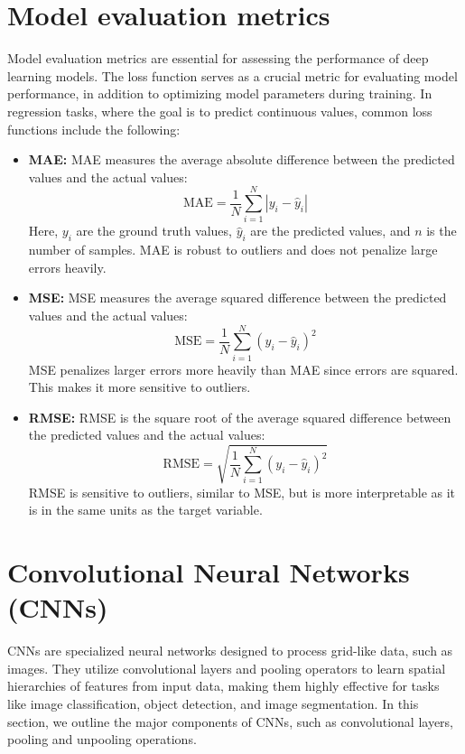 \section{Model evaluation metrics}
Model evaluation metrics are essential for assessing the performance of deep learning models. The loss function serves as a crucial metric for evaluating model performance, in addition to optimizing model parameters during training. In regression tasks, where the goal is to predict continuous values, common loss functions include the following:
\begin{itemize}
\item \textbf{\gls{MAE}:} MAE measures the average absolute difference between the predicted values and the actual values:\[ \text{MAE} = \frac{1}{N} \sum_{i=1}^{N} |y_i - \hat{y}_i| \] Here, $y_i$ are the ground truth values, $\hat{y}_i$ are the predicted values, and $n$ is the number of samples. MAE is robust to outliers and does not penalize large errors heavily.
\item \textbf{\gls{MSE}:} MSE measures the average squared difference between the predicted values and the actual values:\[ \text{MSE} = \frac{1}{N} \sum_{i=1}^{N} (y_i - \hat{y}_i)^2 \] MSE penalizes larger errors more heavily than MAE since errors are squared. This makes it more sensitive to outliers. 
\item \textbf{\gls{RMSE}:} RMSE is the square root of the average squared difference between the predicted values and the actual values: \[ \text{RMSE} = \sqrt{\frac{1}{N} \sum_{i=1}^{N} (y_i - \hat{y}_i)^2} \]RMSE is sensitive to outliers, similar to MSE, but is more interpretable as it is in the same units as the target variable.
\end{itemize}
\section{Convolutional Neural Networks (CNNs)} \label{cnnse}
CNNs \cite{lecun1998} are specialized neural networks designed to process grid-like data, such as images. They utilize convolutional layers and pooling operators to learn spatial hierarchies of features from input data, making them highly effective for tasks like image classification, object detection, and image segmentation. In this section, we outline the major components of CNNs, such as convolutional layers, pooling and unpooling operations. 
